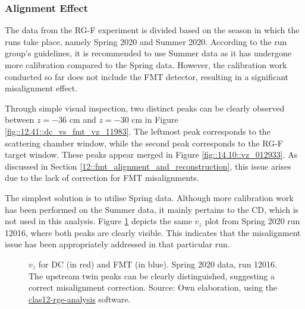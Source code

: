 \subsubsection{Alignment Effect}
\label{14.11::alignment_effect}
    The data from the RG-F experiment is divided based on the season in which the runs take place, namely Spring 2020 and Summer 2020.
    According to the run group's guidelines, it is recommended to use Summer data as it has undergone more calibration compared to the Spring data.
    However, the calibration work conducted so far does not include the FMT detector, resulting in a significant misalignment effect.

    Through simple visual inspection, two distinct peaks can be clearly observed between $z = -36$ cm and $z = -30$ cm in Figure \ref{fig::12.41::dc_vs_fmt_vz_11983}.
    The leftmost peak corresponds to the scattering chamber window, while the second peak corresponds to the RG-F target window.
    These peaks appear merged in Figure \ref{fig::14.10::vz_012933}.
    As discussed in Section \ref{12::fmt_alignment_and_reconstruction}, this issue arises due to the lack of correction for FMT misalignments.

    The simplest solution is to utilise Spring data.
    Although more calibration work has been performed on the Summer data, it mainly pertains to the CD, which is not used in this analysis.
    Figure \ref{fig::14.11::vz_012016} depicts the same $v_z$ plot from Spring 2020 run 12016, where both peaks are clearly visible.
    This indicates that the misalignment issue has been appropriately addressed in that particular run.

    \begin{figure}[t!]
        \centering{}
        \caption[$v_z$ for DC and FMT, run 12016]{$v_z$ for DC (in red) and FMT (in blue).
        Spring 2020 data, run 12016. The upstream twin peaks can be clearly distinguished, suggesting a correct misalignment correction.
        Source: Own elaboration, using the \hyperlink{github.com/bleaktwig/clas12-rge-analysis}{clas12-rge-analysis} software.}
        \label{fig::14.11::vz_012016}
    \end{figure}
